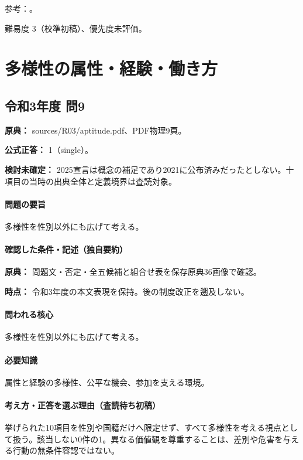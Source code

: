 \par 参考：\cite{ipej_ethics2011,scu_ethics_framework}。

\par 難易度 3（校準初稿）、優先度未評価。

\section{多様性の属性・経験・働き方}

\subsection{令和3年度 問9}
\label{q:r03-reg-apt-09}

\noindent\textbf{原典：} sources/R03/aptitude.pdf、PDF物理9頁。

\textbf{公式正答：} 1（single）。

\par\textbf{検討未確定：} 2025宣言は概念の補足であり2021に公布済みだったとしない。十項目の当時の出典全体と定義境界は査読対象。

\paragraph{問題の要旨} 多様性を性別以外にも広げて考える。

\paragraph{確認した条件・記述（独自要約）}\mbox{}\par

\noindent\textbf{原典：} 問題文・否定・全五候補と組合せ表を保存原典36画像で確認。\par

\noindent\textbf{時点：} 令和3年度の本文表現を保持。後の制度改正を遡及しない。\par

\paragraph{問われる核心} 多様性を性別以外にも広げて考える。

\paragraph{必要知識} 属性と経験の多様性、公平な機会、参加を支える環境。

\paragraph{考え方・正答を選ぶ理由（査読待ち初稿）} 挙げられた10項目を性別や国籍だけへ限定せず、すべて多様性を考える視点として扱う。該当しない0件の1。異なる価値観を尊重することは、差別や危害を与える行動の無条件容認ではない。

